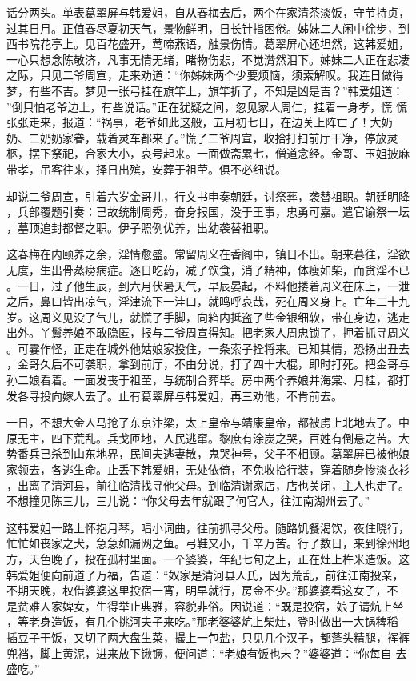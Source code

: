 话分两头。单表葛翠屏与韩爱姐，自从春梅去后，两个在家清茶淡饭，守节持贞，
过其日月。正值春尽夏初天气，景物鲜明，日长针指困倦。姊妹二人闲中徐步，到
西书院花亭上。见百花盛开，莺啼燕语，触景伤情。葛翠屏心还坦然，这韩爱姐，
一心只想念陈敬济，凡事无情无绪，睹物伤悲，不觉潸然泪下。姊妹二人正在悲凄
之际，只见二爷周宣，走来劝道：“你姊妹两个少要烦恼，须索解叹。我连日做得
梦，有些不吉。梦见一张弓挂在旗竿上，旗竿折了，不知是凶是吉？”韩爱姐道：
”倒只怕老爷边上，有些说话。”正在犹疑之间，忽见家人周仁，挂着一身孝，慌
慌张张走来，报道：“祸事，老爷如此这般，五月初七日，在边关上阵亡了！大奶
奶、二奶奶家眷，载着灵车都来了。”慌了二爷周宣，收拾打扫前厅干净，停放灵
柩，摆下祭祀，合家大小，哀号起来。一面做斋累七，僧道念经。金哥、玉姐披麻
带孝，吊客往来，择日出殡，安葬于祖茔。俱不必细说。

却说二爷周宣，引着六岁金哥儿，行文书申奏朝廷，讨祭葬，袭替祖职。朝廷明降
，兵部覆题引奏：已故统制周秀，奋身报国，没于王事，忠勇可嘉。遣官谕祭一坛
，墓顶追封都督之职。伊子照例优养，出幼袭替祖职。

这春梅在内颐养之余，淫情愈盛。常留周义在香阁中，镇日不出。朝来暮往，淫欲
无度，生出骨蒸痨病症。逐日吃药，减了饮食，消了精神，体瘦如柴，而贪淫不已
。一日，过了他生辰，到六月伏暑天气，早辰晏起，不料他搂着周义在床上，一泄
之后，鼻口皆出凉气，淫津流下一洼口，就鸣呼哀哉，死在周义身上。亡年二十九
岁。这周义见没了气儿，就慌了手脚，向箱内抵盗了些金银细软，带在身边，逃走
出外。丫鬟养娘不敢隐匿，报与二爷周宣得知。把老家人周忠锁了，押着抓寻周义
。可霎作怪，正走在城外他姑娘家投住，一条索子拴将来。已知其情，恐扬出丑去
，金哥久后不可袭职，拿到前厅，不由分说，打了四十大棍，即时打死。把金哥与
孙二娘看着。一面发丧于祖茔，与统制合葬毕。房中两个养娘并海棠、月桂，都打
发各寻投向嫁人去了。止有葛翠屏与韩爱姐，再三劝他，不肯前去。

一日，不想大金人马抢了东京汴梁，太上皇帝与靖康皇帝，都被虏上北地去了。中
原无主，四下荒乱。兵戈匝地，人民逃窜。黎庶有涂炭之哭，百姓有倒悬之苦。大
势番兵已杀到山东地界，民间夫逃妻散，鬼哭神号，父子不相顾。葛翠屏已被他娘
家领去，各逃生命。止丢下韩爱姐，无处依倚，不免收拾行装，穿着随身惨淡衣衫
，出离了清河县，前往临清找寻他父母。到临清谢家店，店也关闭，主人也走了。
不想撞见陈三儿，三儿说：“你父母去年就跟了何官人，往江南湖州去了。”

这韩爱姐一路上怀抱月琴，唱小词曲，往前抓寻父母。随路饥餐渴饮，夜住晓行，
忙忙如丧家之犬，急急如漏网之鱼。弓鞋又小，千辛万苦。行了数日，来到徐州地
方，天色晚了，投在孤村里面。一个婆婆，年纪七旬之上，正在灶上杵米造饭。这
韩爱姐便向前道了万福，告道：“奴家是清河县人氏，因为荒乱，前往江南投亲，
不期天晚，权借婆婆这里投宿一宵，明早就行，房金不少。”那婆婆看这女子，不
是贫难人家婢女，生得举止典雅，容貌非俗。因说道：“既是投宿，娘子请炕上坐
，等老身造饭，有几个挑河夫子来吃。”那老婆婆炕上柴灶，登时做出一大锅稗稻
插豆子干饭，又切了两大盘生菜，撮上一包盐，只见几个汉子，都蓬头精腿，裈裤
兜裆，脚上黄泥，进来放下锹镢，便问道：“老娘有饭也未？”婆婆道：“你每自
去盛吃。”

